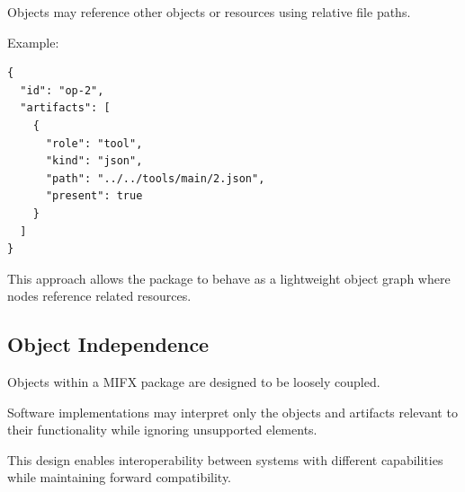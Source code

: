 Objects may reference other objects or resources using relative file paths.

Example:

\begin{verbatim}
{
  "id": "op-2",
  "artifacts": [
    {
      "role": "tool",
      "kind": "json",
      "path": "../../tools/main/2.json",
      "present": true
    }
  ]
}
\end{verbatim}

This approach allows the package to behave as a lightweight object graph where nodes reference related resources.

\subsection{Object Independence}

Objects within a MIFX package are designed to be loosely coupled.

Software implementations may interpret only the objects and artifacts relevant to their functionality while ignoring unsupported elements.

This design enables interoperability between systems with different capabilities while maintaining forward compatibility.